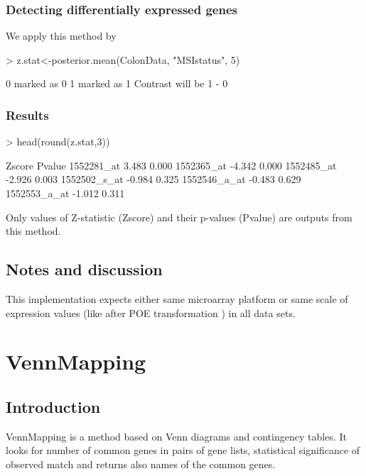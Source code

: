 \documentclass[a4paper]{report}
\begin{document}
\subsection*{Detecting differentially expressed genes}
We apply this method by
\begin{Schunk}
\begin{Sinput}
> z.stat<-posterior.mean(ColonData, "MSIstatus", 5)
\end{Sinput}
\begin{Soutput}
0 marked as 0
1 marked as 1
Contrast will be 1 - 0 
\end{Soutput}
\end{Schunk}
\subsection*{Results}
\begin{Schunk}
\begin{Sinput}
> head(round(z.stat,3))
\end{Sinput}
\begin{Soutput}
             Zscore Pvalue
1552281_at    3.483  0.000
1552365_at   -4.342  0.000
1552485_at   -2.926  0.003
1552502_s_at -0.984  0.325
1552546_a_at -0.483  0.629
1552553_a_at -1.012  0.311
\end{Soutput}
\end{Schunk}
Only values of Z-statistic ({\ttfamily Zscore}) and their p-values ({\ttfamily Pvalue}) are outputs from this method.
\section*{Notes and discussion}
This implementation expects either same microarray platform or same scale of expression values (like after POE transformation \cite{metaArray}) in all data sets.

          
\chapter{VennMapping}
\section*{Introduction}
VennMapping \cite{Smid} is a method based on Venn diagrams and contingency tables. It looks for number of common genes in pairs of gene lists, statistical significance of observed match and returns also names of the common genes.
\end{document}
